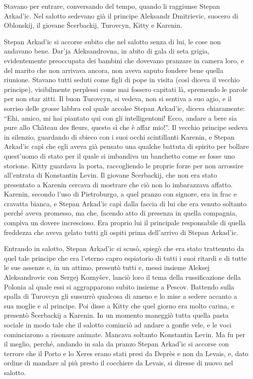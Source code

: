 Stavano per entrare, conversando del tempo, quando li raggiunse Stepan Arkad'ic. Nel salotto sedevano già il principe Aleksandr Dmitrievic, suocero di Oblonskij, il giovane Šcerbackij, Turovcyn, Kitty e Karenin. 
\enlargethispage*{1\baselineskip}

Stepan Arkad'ic si accorse subito che nel salotto senza di lui, le cose non andavano bene. Dar'ja Aleksandrovna, in abito di gala di seta grigia, evidentemente preoccupata dei bambini che dovevano pranzare in camera loro, e del marito che non arrivava ancora, non aveva saputo fondere bene quella riunione. Stavano tutti seduti come figli di pope in visita (così diceva il vecchio principe), visibilmente perplessi come mai fossero capitati là, spremendo le parole per non star zitti. Il buon Turovcyn, si vedeva, non si sentiva a suo agio, e il sorriso delle grosse labbra col quale accolse Stepan Arkad'ic, diceva chiaramente: ``Ehi, amico, mi hai piantato qui con gli intelligentoni! Ecco, andare a bere sia pure allo Château des fleurs, questo sì che è affar mio!''. Il vecchio principe sedeva in silenzio, guardando di sbieco con i suoi occhi scintillanti Karenin, e Stepan Arkad'ic capì che egli aveva già pensato una qualche battuta di spirito per bollare quest'uomo di stato per il quale si imbandiva un banchetto come se fosse uno storione. Kitty guardava la porta, raccogliendo le proprie forze per non arrossire all'entrata di Konstantin Levin. Il giovane Šcerbackij, che non era stato presentato a Karenin cercava di mostrare che ciò non lo imbarazzava affatto. Karenin, secondo l'uso di Pietroburgo, a quel pranzo con signore, era in frac e cravatta bianca, e Stepan Arkad'ic capì dalla faccia di lui che era venuto soltanto perché aveva promesso, ma che, facendo atto di presenza in quella compagnia, compiva un dovere increscioso. Era proprio lui il principale responsabile di quella freddezza che aveva gelato tutti gli ospiti prima dell'arrivo di Stepan Arkad'ic. 

Entrando in salotto, Stepan Arkad'ic si scusò, spiegò che era stato trattenuto da quel tale principe che era l'eterno capro espiatorio di tutti i suoi ritardi e di tutte le sue assenze e, in un attimo, presentò tutti e, messi insieme Aleksej Aleksandrovic con Sergej Koznyšev, lanciò loro il tema della russificazione della Polonia al quale essi si aggrapparono subito insieme a Pescov. Battendo sulla spalla di Turovcyn gli sussurrò qualcosa di ameno e lo mise a sedere accanto a sua moglie e al principe. Poi disse a Kitty che quel giorno era molto carina, e presentò Šcerbackij a Karenin. In un momento maneggiò tutta quella pasta sociale in modo tale che il salotto cominciò ad andare a gonfie vele, e le voci cominciarono a risonare animate. Mancava soltanto Konstantin Levin. Ma fu per il meglio, perché, andando in sala da pranzo Stepan Arkad'ic si accorse con terrore che il Porto e lo Xeres erano stati presi da Deprès e non da Levais, e, dato ordine di mandare al più presto il cocchiere da Levais, si diresse di nuovo nel salotto. 

